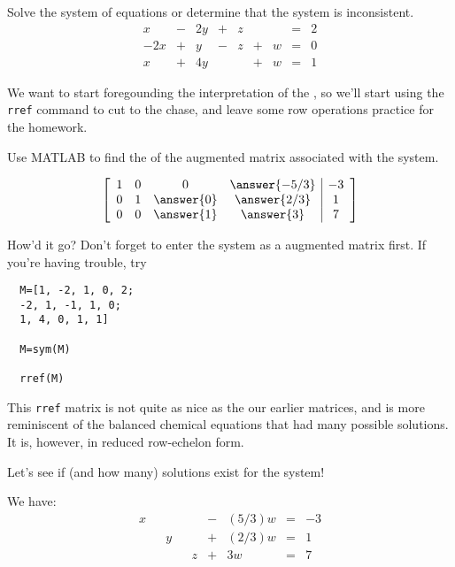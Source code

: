 \documentclass{ximera}
\begin{document}
 
\begin{example}\label{ex:freevar1} Solve the system of equations or determine that the system is inconsistent.
$$\begin{array}{ccccccccc}
      x &- &2y&+&z&&&= &2 \\
     -2x& +&y&-&z&+&w&=&0\\
     x& +&4y&&&+&w&=&1
    \end{array}$$



We want to start foregounding the interpretation of the \rref, so we'll start using the \texttt{rref} command to cut to the chase, and leave some row operations practice for the homework.

Use MATLAB to find the \rref of the augmented matrix associated with the system. 



$$\left[\begin{array}{cccc|c} 
 1&0&0&\answer{-5/3}&-3\\0&1&\answer{0}&\answer{2/3}&1\\0&0&\answer{1}&\answer{3}&7
 \end{array}\right]$$



 \begin{feedback}
 
  How'd it go? Don't forget to enter the system as a augmented matrix first. If you're having trouble, try

  \begin{verbatim}
  M=[1, -2, 1, 0, 2;
  -2, 1, -1, 1, 0;
  1, 4, 0, 1, 1]

  M=sym(M)

  rref(M)
  \end{verbatim}

 \end{feedback}
  
This \texttt{rref} matrix is not quite as nice as the our earlier matrices, and is more reminiscent of the balanced chemical equations that had many possible solutions. It is, however, in reduced row-echelon form.  

Let's see if (and how many) solutions exist for the system!

We have:
 $$\begin{array}{ccccccccc}
      x & &&&&-&(5/3)w&= &-3 \\
     & &y&&&+&(2/3)w&=&1\\
     & &&&z&+&3w&=&7
    \end{array}$$


\end{example}
\end{document}
